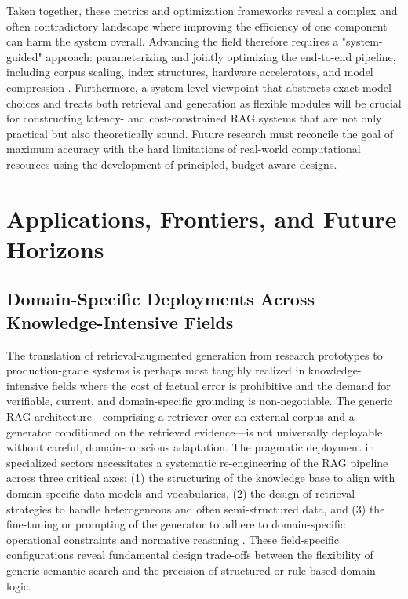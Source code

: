 \documentclass[11pt,a4paper]{article}
\begin{document}
Taken together, these metrics and optimization frameworks reveal a complex and often contradictory landscape where improving the efficiency of one component can harm the system overall. Advancing the field therefore requires a "system-guided" approach: parameterizing and jointly optimizing the end-to-end pipeline, including corpus scaling, index structures, hardware accelerators, and model compression \cite{arxiv:2506.00054v1}. Furthermore, a system-level viewpoint that abstracts exact model choices and treats both retrieval and generation as flexible modules will be crucial for constructing latency- and cost-constrained RAG systems that are not only practical but also theoretically sound. Future research must reconcile the goal of maximum accuracy with the hard limitations of real-world computational resources using the development of principled, budget-aware designs.


\section{Applications, Frontiers, and Future Horizons}



\subsection{Domain-Specific Deployments Across Knowledge-Intensive Fields}


The translation of retrieval-augmented generation from research prototypes to production-grade systems is perhaps most tangibly realized in knowledge-intensive fields where the cost of factual error is prohibitive and the demand for verifiable, current, and domain-specific grounding is non-negotiable. The generic RAG architecture---comprising a retriever over an external corpus and a generator conditioned on the retrieved evidence---is not universally deployable without careful, domain-conscious adaptation. The pragmatic deployment in specialized sectors necessitates a systematic re-engineering of the RAG pipeline across three critical axes: (1) the structuring of the knowledge base to align with domain-specific data models and vocabularies, (2) the design of retrieval strategies to handle heterogeneous and often semi-structured data, and (3) the fine-tuning or prompting of the generator to adhere to domain-specific operational constraints and normative reasoning \cite{arxiv:2501.13958v3,arxiv:2312.10997v5}. These field-specific configurations reveal fundamental design trade-offs between the flexibility of generic semantic search and the precision of structured or rule-based domain logic.
\end{document}
